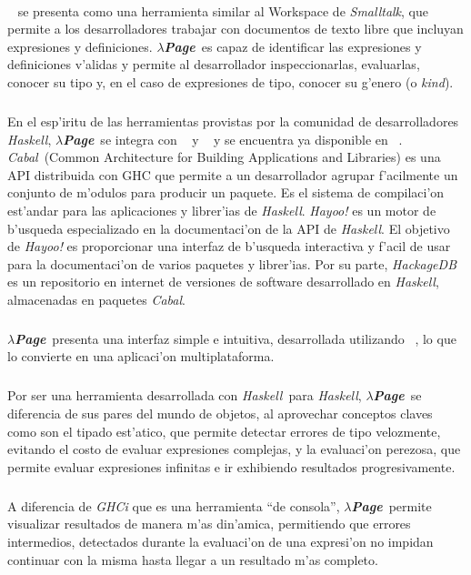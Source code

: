 \documentclass[a4paper]{article}
\newcommand{\haskell}{\textsl{Haskell}}
\newcommand{\hpage}{\textbf{\textsl{$\lambda$Page}}}
\newcommand{\cabal}{\textsl{Cabal}}
\begin{document}
\paragraph{} \htmladdnormallink{\hpage}{http://haskell.hpage.com}~\cite{hpage} se presenta como una herramienta  similar al Workspace de \textit{Smalltalk}, que permite a los desarrolladores trabajar con documentos de texto libre que incluyan expresiones y definiciones.  \hpage\ es capaz de identificar las expresiones y definiciones v'alidas y permite al desarrollador inspeccionarlas, evaluarlas, conocer su tipo y, en el caso de expresiones de tipo, conocer su g'enero (o \textsl{kind}).
\subparagraph{}En el esp'iritu de las herramientas provistas por la comunidad de desarrolladores \haskell, \hpage\ se integra con ~\cite{cabal} y ~\cite{hayoo} y se encuentra ya disponible en ~\cite{hackage}.  \cabal\ (Common Architecture for Building Applications and Libraries) es una API distribuida con GHC que permite a un desarrollador agrupar f'acilmente un conjunto de m'odulos para producir un paquete. Es el sistema de compilaci'on est'andar para las aplicaciones y librer'ias de \haskell.  \textsl{Hayoo!} es un motor de b'usqueda especializado en la documentaci'on de la API de \haskell.  El objetivo de \textsl{Hayoo!} es proporcionar una interfaz de b'usqueda interactiva y f'acil de usar para la documentaci'on de varios paquetes y librer'ias.  Por su parte, \textsl{HackageDB} es 
un repositorio en internet de versiones de software desarrollado en \haskell, almacenadas en paquetes \cabal.
\subparagraph{}\hpage\ presenta una interfaz simple e intuitiva, desarrollada utilizando ~\cite{wxhaskell}, lo que lo convierte en una aplicaci'on multiplataforma.
\subparagraph{}Por ser una herramienta desarrollada con \haskell\ para \haskell, \hpage\ se diferencia de sus pares del mundo de objetos, al aprovechar conceptos claves como son el tipado est'atico, que permite detectar errores de tipo velozmente, evitando el costo de evaluar expresiones complejas, y la evaluaci'on perezosa, que permite evaluar expresiones infinitas e ir exhibiendo resultados progresivamente.
\subparagraph{}A diferencia de \textsl{GHCi} que es una herramienta ``de consola'', \hpage\ permite visualizar resultados de manera m'as din'amica, permitiendo que errores intermedios, detectados durante la evaluaci'on de una expresi'on no impidan continuar con la misma hasta llegar a un resultado m'as completo.
\end{document}
